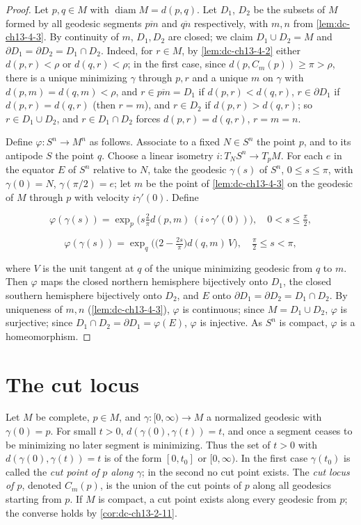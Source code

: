 \begin{proof}
  \sketch
  Let $p,q\in M$ with $\operatorname{diam}M=d(p,q)$. Let $D_1$,
  $D_2$ be the subsets of $M$ formed by all geodesic segments $\overline{pm}$ and
  $\overline{qn}$ respectively, with $m,n$ from \cref{lem:dc-ch13-4-3}. By continuity of $m$, $D_1,D_2$ are closed; we claim $D_1\cup D_2=M$ and
  $\partial D_1=\partial D_2=D_1\cap D_2$. Indeed, for $r\in M$, by \cref{lem:dc-ch13-4-2} either
  $d(p,r)<\rho$ or $d(q,r)<\rho$; in the first case, since $d(p,C_m(p))\geq\pi>\rho$,
  there is a unique minimizing $\gamma$ through $p,r$ and a unique $m$ on $\gamma$ with
  $d(p,m)=d(q,m)<\rho$, and $r\in\overline{pm}=D_1$ if $d(p,r)<d(q,r)$, $r\in\partial D_1$
  if $d(p,r)=d(q,r)$ (then $r=m$), and $r\in D_2$ if $d(p,r)>d(q,r)$; so
  $r\in D_1\cup D_2$, and $r\in D_1\cap D_2$ forces $d(p,r)=d(q,r)$, $r=m=n$.

  Define $\varphi:S^n\to M^n$ as follows. Associate to a fixed $N\in S^n$ the point
  $p$, and to its antipode $S$ the point $q$. Choose a linear isometry
  $i:T_NS^n\to T_pM$. For each $e$ in the equator $E$ of $S^n$ relative to $N$, take
  the geodesic $\gamma(s)$ of $S^n$, $0\leq s\leq\pi$, with $\gamma(0)=N$,
  $\gamma(\pi/2)=e$; let $m$ be the point of \cref{lem:dc-ch13-4-3} on the geodesic of $M$ through
  $p$ with velocity $i\gamma'(0)$. Define

  $$
  \varphi(\gamma(s))=\exp_p\!\Big(s\tfrac{2}{\pi}d(p,m)\,(i\circ\gamma'(0))\Big),\quad 0<s\leq\tfrac{\pi}{2},
  $$

  $$
  \varphi(\gamma(s))=\exp_q\!\Big(\big(2-\tfrac{2s}{\pi}\big)d(q,m)\,V\Big),\quad\tfrac{\pi}{2}\leq s<\pi,
  $$

  where $V$ is the unit tangent at $q$ of the unique minimizing geodesic from $q$ to
  $m$. Then $\varphi$ maps the closed northern hemisphere bijectively onto $D_1$, the
  closed southern hemisphere bijectively onto $D_2$, and $E$ onto
  $\partial D_1=\partial D_2=D_1\cap D_2$. By uniqueness of $m,n$ (\cref{lem:dc-ch13-4-3}),
  $\varphi$ is continuous; since $M=D_1\cup D_2$, $\varphi$ is surjective; since
  $D_1\cap D_2=\partial D_1=\varphi(E)$, $\varphi$ is injective. As $S^n$ is compact,
  $\varphi$ is a homeomorphism.
\end{proof}

\section{The cut locus}

Let $M$ be complete, $p\in M$, and $\gamma:[0,\infty)\to M$ a normalized geodesic
with $\gamma(0)=p$. For small $t>0$, $d(\gamma(0),\gamma(t))=t$, and once a segment
ceases to be minimizing no later segment is minimizing. Thus the set of $t>0$ with
$d(\gamma(0),\gamma(t))=t$ is of the form $[0,t_0]$ or $[0,\infty)$. In the first
case $\gamma(t_0)$ is called the \emph{cut point of $p$ along $\gamma$}; in the second
no cut point exists. The \emph{cut locus of $p$}, denoted $C_m(p)$, is the union of the
cut points of $p$ along all geodesics starting from $p$. If $M$ is compact, a cut
point exists along every geodesic from $p$; the converse holds by
\cref{cor:dc-ch13-2-11}.

